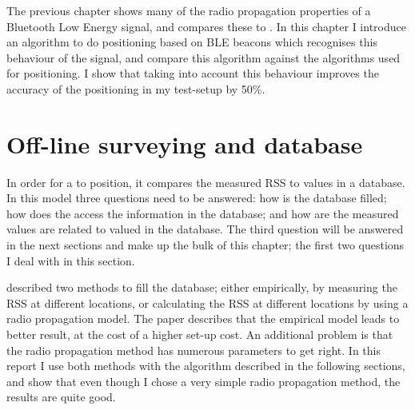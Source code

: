 The previous chapter shows many of the radio propagation properties of a Bluetooth Low Energy signal, and compares these to \wifi.
In this chapter I introduce an algorithm to do positioning based on BLE beacons which recognises this behaviour of the signal, and compare this algorithm against the algorithms used for \wifi positioning.
I show that taking into account this behaviour improves the accuracy of the positioning in my test-setup by 50\%.

\section{Off-line surveying and database}

In order for a \device to position, it compares the measured RSS to values in a database.
In this model three questions need to be answered: how is the database filled; how does the \device access the information in the database; and how are the measured values are related to valued in the database.
The third question will be answered in the next sections and make up the bulk of this chapter; the first two questions I deal with in this section.

\citet{bahl2000radar} described two methods to fill the database; either empirically, by measuring the RSS at different locations, or calculating the RSS at different locations by using a radio propagation model.
The paper describes that the empirical model leads to better result, at the cost of a higher set-up cost. 
An additional problem is that the radio propagation method has numerous parameters to get right.
In this report I use both methods with the algorithm described in the following sections, and show that even though I chose a very simple radio propagation method, the results are quite good.

